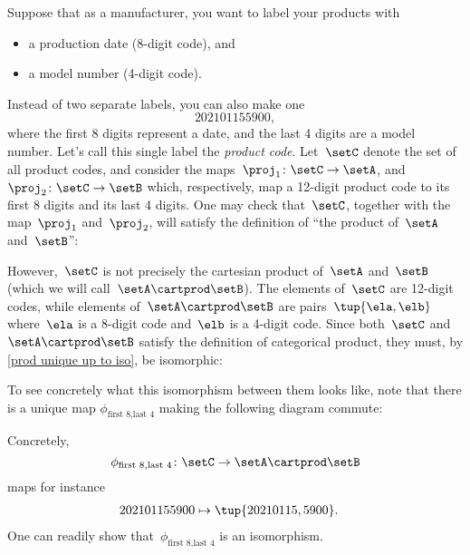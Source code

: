
\begin{example}
    \label{ex:univ-prop-prod}
    Suppose that as a manufacturer, you want to label your products with
    \begin{itemize}
        \item a production date (8-digit code), and
        \item a model number (4-digit code).
    \end{itemize}
    Instead of two separate labels, you can also make one
    \begin{equation}
        \label{eq:exa-prod-univ-prop-code}
        202101155900,
    \end{equation}
    where the first 8 digits represent a date, and the last 4 digits are a model number.
    Let's call this single label the \emph{product code}.
    Let~$\setC$ denote the set of all product codes, and consider the maps~$\proj_1\colon \setC\to \setA$, and~$\proj_2\colon \setC\to \setB$ which, respectively, map a 12-digit product code to its first 8 digits and its last 4 digits.
    One may check that~$\setC$, together with the map~$\proj_1$ and~$\proj_2$, will satisfy the definition of ``the product of~$\setA$ and~$\setB$'':


    However,~$\setC$ is not precisely the cartesian product of~$\setA$ and~$\setB$ (which we will call~$\setA\cartprod \setB$).
    The elements of~$\setC$ are 12-digit codes, while elements of~$\setA\cartprod \setB$ are pairs~$\tup{\ela,\elb}$ where~$\ela$ is a 8-digit code and~$\elb$ is a 4-digit code.
    Since both~$\setC$ and~$\setA\cartprod \setB$ satisfy the definition of categorical product, they must, by \cref{prod unique up to iso}, be isomorphic:


    To see concretely what this isomorphism between them looks like, note that there is a unique map $\phi_{\text{first 8},\text{last 4}}$ making the following diagram commute:


    Concretely,
    \begin{equation}
        \label{eq:exa-univ-iso}
        \phi_{\text{first 8},\text{last 4}}\colon \setC \to \setA\cartprod \setB
    \end{equation}
    maps for instance
    \begin{equation}
        \label{eq:exa-univ-iso-concrete}
        \begin{aligned}
            202101155900 & \mapsto \tup{20210115,5900}.
        \end{aligned}
    \end{equation}
    One can readily show that~$\phi_{\text{first 8},\text{last 4}}$ is an isomorphism.
\end{example}

